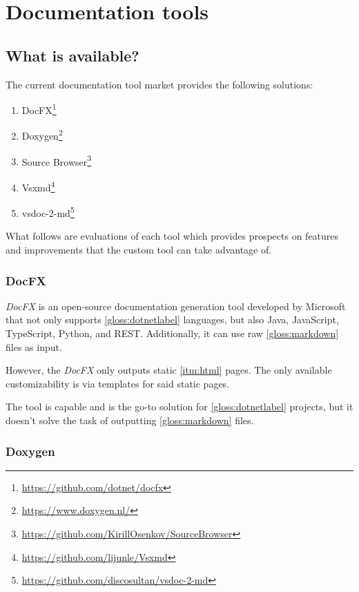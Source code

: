\chapter{Documentation tools}
\section{What is available?} \label{sec:whatisavailable}
The current documentation tool market provides the following solutions:

\begin{enumerate}
    \item DocFX\footnote{\href{https://github.com/dotnet/docfx}{https://github.com/dotnet/docfx}}
    \item Doxygen\footnote{\href{https://www.doxygen.nl/}{https://www.doxygen.nl/}}
    \item Source Browser\footnote{\href{https://github.com/KirillOsenkov/SourceBrowser}{https://github.com/KirillOsenkov/SourceBrowser}}
    \item Vsxmd\footnote{\href{https://github.com/lijunle/Vsxmd}{https://github.com/lijunle/Vsxmd}}
    \item vsdoc-2-md\footnote{\href{https://github.com/discosultan/vsdoc-2-md}{https://github.com/discosultan/vsdoc-2-md}}
\end{enumerate}

What follows are evaluations of each tool which provides prospects on features and improvements that the custom tool can take advantage of.

\subsection{DocFX} \label{ssec:docfx}

\textit{DocFX} is an open-source documentation generation tool developed by Microsoft that not only supports \ref{gloss:dotnetlabel} languages, but also Java, JavaScript, TypeScript, Python, and REST. Additionally, it can use raw \ref{gloss:markdown} files as input.

However, the \textit{DocFX} only outputs static \ref{itm:html} pages. The only available customizability is via templates for said static pages.

The tool is capable and is the go-to solution for \ref{gloss:dotnetlabel} projects, but it doesn't solve the task of outputting \ref{gloss:markdown} files.

\subsection{Doxygen} \label{sec:doxygen}


